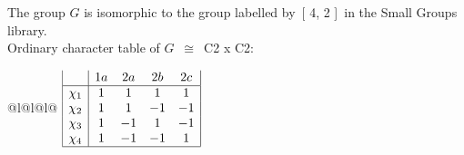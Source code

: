 \documentclass[varwidth=\maxdimen,border=10]{standalone}
\begin{document}
The group $G$ is isomorphic to the group labelled by\ [ 4, 2 ]\ in the Small Groups library.\\
Ordinary character table of $G$\ $\cong$\ C2 x C2:\\
\begin{center}
\begin{tabular}{@{}l@{}l@{}l@{}}
\hline
\(\begin{array}{|l|cccc|}
  & 1a & 2a & 2b & 2c\\ \hline
\chi_{1} & 1 & 1 & 1 & 1\\
\chi_{2} & 1 & 1 & -1 & -1\\
\chi_{3} & 1 & -1 & 1 & -1\\
\chi_{4} & 1 & -1 & -1 & 1\\
\hline
\end{array}\)\\
\end{tabular}
\end{center}
\end{document}
